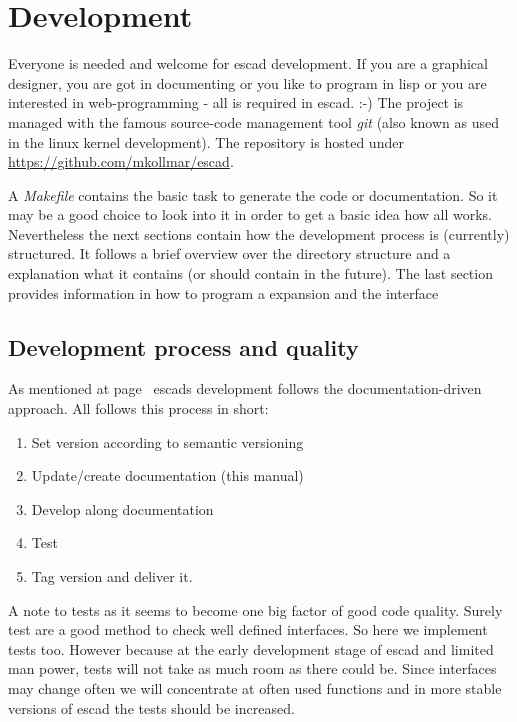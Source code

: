\documentclass[a4paper, 12pt, openany]{scrbook}
\begin{document}
\chapter{Development}
Everyone is needed and welcome for escad development. If you are a graphical designer, you are got in documenting or you like to program in lisp or you are interested in web-programming - all is required in escad. :-)
The project is managed with the famous source-code management tool \emph{git} (also known as used in the linux kernel development). The repository is hosted under \url{https://github.com/mkollmar/escad}.

A \emph{Makefile} contains the basic task to generate the code or documentation. So it may be a good choice to look into it in order to get a basic idea how all works. Nevertheless the next sections contain how the development process is (currently) structured. It follows a brief overview over the directory structure and a explanation what it contains (or should contain in the future). The last section provides information in how to program a expansion and the interface
\section{Development process and quality}
As mentioned at page~\pageref{sec:ddd} escads development follows the documentation-driven approach.
All follows this process in short:
\begin{enumerate}
\item Set version according to semantic versioning \parencite{web:semver}
\item Update/create documentation (this manual)
\item Develop along documentation
\item Test
\item Tag version and deliver it.
\end{enumerate}
A note to tests as it seems to become one big factor of good code quality. Surely test are a good method to check well defined interfaces. So here we implement tests too. However because at the early development stage of escad and limited man power, tests will not take as much room as there could be. Since interfaces may change often we will concentrate at often used functions and in more stable versions of escad the tests should be increased.
\end{document}
